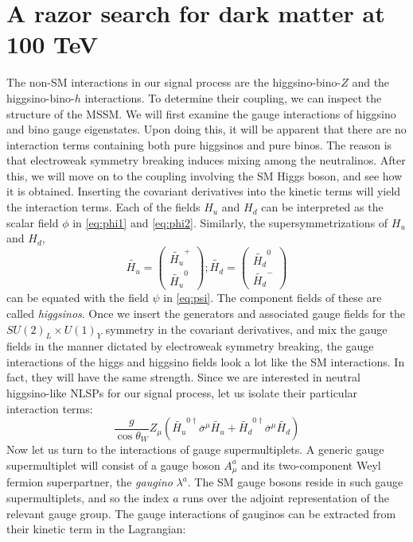 \chapter{A razor search for dark matter at 100 TeV}\label{ch:DM_100_TeV}

\newcommand{\cb}{ c_\beta}
\newcommand{\cw}{ c_W}
\newcommand{\sinb}{ s_\beta}
\newcommand{\sw}{ s_W}
\newcommand{\mz}{ m_Z}

The non-SM interactions in our signal process are the higgsino-bino-$Z$ and the higgsino-bino-$h$ interactions. To determine their coupling, we can inspect the structure of the MSSM. We will first examine the gauge interactions of higgsino and bino gauge eigenstates. Upon doing this, it will be apparent that there are no interaction terms containing both pure higgsinos and pure binos. The reason is that electroweak symmetry breaking induces mixing among the neutralinos. After this, we will move on to the coupling involving the SM Higgs boson, and see how it is obtained. 
Inserting the covariant derivatives into the kinetic terms will yield the interaction terms. Each of the fields $H_u$ and $H_d$ can be interpreted as the scalar field $\phi$ in \eqref{eq:phi1} and \eqref{eq:phi2}. Similarly, the supersymmetrizations of $H_u$ and $H_d$,
\[\widetilde{H_u} = \begin{pmatrix}\widetilde{H_u}^+\\\widetilde{H_u}^0\end{pmatrix};
\widetilde{H_d} = \begin{pmatrix}\widetilde{H_d}^0\\\widetilde{H_d}^-\end{pmatrix}\]
can be equated with the field $\psi$ in \eqref{eq:psi}. The component fields of these are called \emph{higgsinos}. Once we insert the generators and associated gauge fields for the $SU(2)_L\times U(1)_Y$ symmetry in the covariant derivatives, and mix the gauge fields in the manner dictated by electroweak symmetry breaking, the gauge interactions of the higgs and higgsino fields look a lot like the SM interactions. In fact, they will have the same strength. Since we are interested in neutral higgsino-like NLSPs for our signal process, let us isolate their particular interaction terms:
\[\frac{g}{\cos\theta_W}Z_\mu\left(\widetilde{H_u}^{0\dagger}\overline{\sigma}^\mu \widetilde{H_u}+
\widetilde{H_d}^{0\dagger}\overline{\sigma}^\mu \widetilde{H_d}\right)\]
Now let us turn to the interactions of gauge supermultiplets. A generic gauge supermultiplet will consist of a gauge boson $A_\mu^a$ and its two-component Weyl fermion superpartner, the \emph{gaugino} $\lambda^a$. The SM gauge bosons reside in such gauge supermultiplets, and so the index $a$ runs over the adjoint representation of the relevant gauge group. The gauge interactions of gauginos can be extracted from their kinetic term in the Lagrangian:

